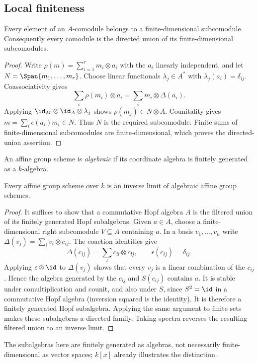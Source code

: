 \subsection{Local finiteness}
\begin{theorem}\label{local-finiteness-comodules}
Every element of an $A$-comodule belongs to a finite-dimensional subcomodule.
Consequently every comodule is the directed union of its finite-dimensional
subcomodules.
\end{theorem}
\begin{proof}
Write $\rho(m)=\sum_{i=1}^r m_i\otimes a_i$ with the $a_i$ linearly
independent, and let $N=\Span\{m_1,\ldots,m_r\}$. Choose linear
functionals $\lambda_j\in A^*$ with $\lambda_j(a_i)=\delta_{ij}$.
Coassociativity gives
\[
 \sum_i\rho(m_i)\otimes a_i=\sum_i m_i\otimes\Delta(a_i).
\]
Applying $\id_M\otimes\id_A\otimes\lambda_j$ shows
$\rho(m_j)\in N\otimes A$. Counitality gives
$m=\sum_i\epsilon(a_i)m_i\in N$. Thus $N$ is the required subcomodule.
Finite sums of finite-dimensional subcomodules are finite-dimensional,
which proves the directed-union assertion.
\end{proof}

\begin{definition}
An affine group scheme is \emph{algebraic} if its coordinate algebra is
finitely generated as a $k$-algebra.
\end{definition}

\begin{corollary}\label{affine-inverse-limit}
Every affine group scheme over $k$ is an inverse limit of algebraic affine
group schemes.
\end{corollary}
\begin{proof}
It suffices to show that a commutative Hopf algebra $A$ is the filtered union
of its finitely generated Hopf subalgebras. Given $a\in A$, choose a
finite-dimensional right subcomodule $V\subseteq A$ containing $a$.
In a basis $v_1,\ldots,v_n$ write
$\Delta(v_j)=\sum_i v_i\otimes c_{ij}$. The coaction identities give
\[
 \Delta(c_{ij})=\sum_l c_{il}\otimes c_{lj},\qquad
 \epsilon(c_{ij})=\delta_{ij}.
\]
Applying $\epsilon\otimes\id$ to $\Delta(v_j)$ shows that every $v_j$
is a linear combination of the $c_{ij}$. Hence the algebra generated by
the $c_{ij}$ and $S(c_{ij})$ contains $a$. It is stable under
comultiplication and counit, and also under $S$, since $S^2=\id$ in a
commutative Hopf algebra (inversion squared is the identity). It is
therefore a finitely generated Hopf subalgebra. Applying the same argument
to finite sets makes these subalgebras a directed family. Taking spectra
reverses the resulting filtered union to an inverse limit.
\end{proof}
The subalgebras here are finitely generated as algebras, not necessarily
finite-dimensional as vector spaces; $k[x]$ already illustrates the distinction.

